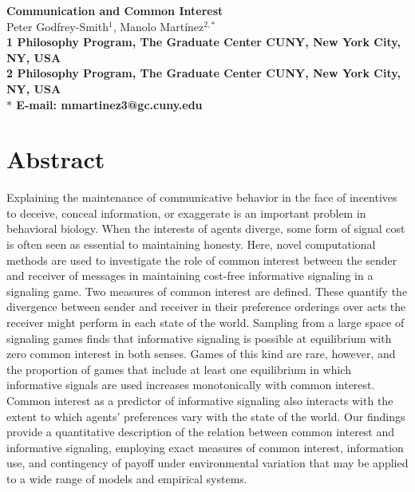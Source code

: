 \documentclass[10pt]{article}
\date{}
\begin{document}
\begin{flushleft}
{\Large
\textbf{Communication and Common Interest}
}
\\
Peter Godfrey-Smith$^{1}$, 
Manolo Mart\'inez$^{2, \ast}$
\\
\bf{1} Philosophy Program, The Graduate Center CUNY, New York City, NY, USA
\\
\bf{2} Philosophy Program, The Graduate Center CUNY, New York City, NY, USA
\\
$\ast$ E-mail: mmartinez3@gc.cuny.edu
\end{flushleft}

\section*{Abstract}

Explaining the maintenance of communicative behavior in the face of
incentives to deceive, conceal information, or exaggerate is an
important problem in behavioral biology. When the interests of agents
diverge, some form of signal cost is often seen as essential to
maintaining honesty. Here, novel computational methods are used to investigate the role of
common interest between the sender and receiver of messages in
maintaining cost-free informative signaling in a signaling game. Two
measures of common interest are defined. These quantify the divergence
between sender and receiver in their preference orderings over acts the
receiver might perform in each state of the world. Sampling from a large
space of signaling games finds that informative signaling is possible at
equilibrium with zero common interest in both senses. Games of this kind
are rare, however, and the proportion of games that include at least one
equilibrium in which informative signals are used increases
monotonically with common interest. Common interest as a predictor of
informative signaling also interacts with the extent to which agents'
preferences vary with the state of the world. Our findings provide a quantitative description of the relation between
common interest and informative signaling, employing exact measures of
common interest, information use, and contingency of payoff under
environmental variation that may be applied to a wide range of models
and empirical systems.

\end{document}
